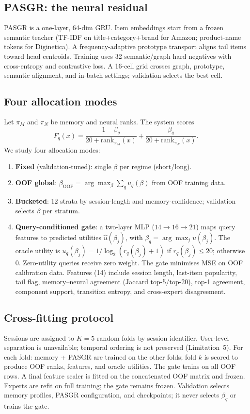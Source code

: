 \documentclass[runningheads]{llncs}
\begin{document}
\subsection{PASGR: the neural residual}
PASGR is a one-layer, 64-dim GRU. Item embeddings start from a frozen
semantic teacher (TF-IDF on title+category+brand for Amazon; product-name
tokens for Diginetica). A frequency-adaptive prototype transport aligns
tail items toward head centroids. Training uses 32 semantic/graph hard
negatives with cross-entropy and contrastive loss. A 16-cell grid crosses
graph, prototype, semantic alignment, and in-batch settings; validation
selects the best cell.

\subsection{Four allocation modes}
Let $\pi_M$ and $\pi_N$ be memory and neural ranks. The system scores
\begin{equation}
F_q(x)=\frac{1-\beta_q}{20+\mathrm{rank}_{\pi_M}(x)}
     +\frac{\beta_q}{20+\mathrm{rank}_{\pi_N}(x)}.
\end{equation}
We study four allocation modes:
\begin{enumerate}
\item \textbf{Fixed} (validation-tuned): single $\beta$ per regime (short/long).
\item \textbf{OOF global}: $\beta_{\text{OOF}} = \arg\max_\beta \sum_q u_q(\beta)$
      from OOF training data.
\item \textbf{Bucketed}: 12 strata by session-length and memory-confidence;
      validation selects $\beta$ per stratum.
\item \textbf{Query-conditioned gate}: a two-layer MLP ($14\!\to\!16\!\to\!21$)
      maps query features to predicted utilities $\hat u(\beta_j)$, with
      $\beta_q = \arg\max_j \hat u(\beta_j)$. The oracle utility is
      $u_q(\beta_j) = 1/\!\log_2(r_q(\beta_j)\!+\!1)$ if $r_q(\beta_j)\!\leq\!20$;
      otherwise 0. Zero-utility queries receive zero weight. The gate
      minimises MSE on OOF calibration data. Features (14) include session
      length, last-item popularity, tail flag, memory--neural agreement
      (Jaccard top-5/top-20), top-1 agreement, component support, transition
      entropy, and cross-expert disagreement.
\end{enumerate}

\subsection{Cross-fitting protocol}
Sessions are assigned to $K\!=\!5$ random folds by session identifier. User-level
separation is unavailable; temporal ordering is not preserved (Limitation~5).
For each fold: memory + PASGR are trained on the other folds; fold $k$ is
scored to produce OOF ranks, features, and oracle utilities. The gate trains
on all OOF rows. A final feature scaler is fitted on the concatenated OOF
matrix and frozen. Experts are refit on full training; the gate remains frozen.
Validation selects memory profiles, PASGR configuration, and checkpoints; it
never selects $\beta_q$ or trains the gate.
\end{document}

